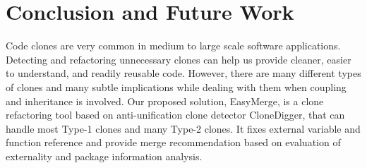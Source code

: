 \documentclass{acm_proc_article-sp}
\begin{document}
\section{Conclusion and Future Work}
Code clones are very common in medium to large scale software applications.
Detecting and refactoring unnecessary clones can help us provide cleaner, easier to understand, and readily reusable code.
However, there are many different types of clones and many subtle implications while dealing with them when coupling and
inheritance is involved. Our proposed solution, EasyMerge, is a clone refactoring tool based on anti-unification clone detector 
CloneDigger, that can handle most Type-1 clones and many Type-2 clones. It fixes external variable and function reference
and provide merge recommendation based on evaluation of externality and package information analysis.






%

%
%
\end{document}
